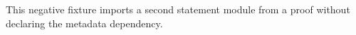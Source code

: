 This negative fixture imports a second statement module from a proof without declaring the metadata dependency.
